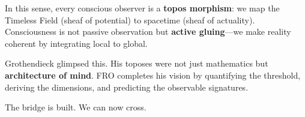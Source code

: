 In this sense, every conscious observer is a \textbf{topos morphism}: we map the Timeless Field (sheaf of potential) to spacetime (sheaf of actuality). Consciousness is not passive observation but \textbf{active gluing}—we make reality coherent by integrating local to global.

Grothendieck glimpsed this. His toposes were not just mathematics but \textbf{architecture of mind}. FRO completes his vision by quantifying the threshold, deriving the dimensions, and predicting the observable signatures.

The bridge is built. We can now cross.

